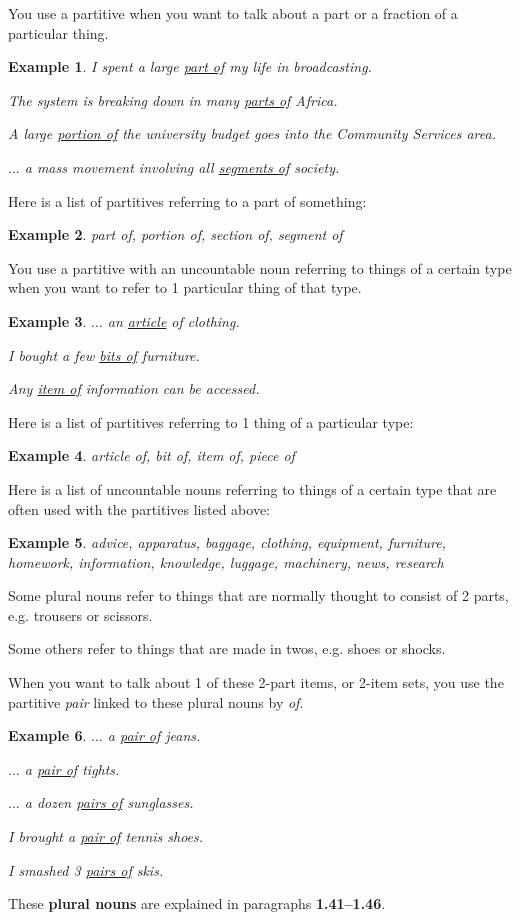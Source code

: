 \documentclass[oneside]{book}
\numberwithin{equation}{section}
\newtheorem{example}{Example}[section]
\begin{document}
%
\noindent{} You use a partitive when you want to talk about a part or a fraction of a particular thing.
\begin{example}
    I spent a large \underline{part of} my life in broadcasting.
    
    The system is breaking down in many \underline{parts of} Africa.
    
    A large \underline{portion of} the university budget goes into the Community Services area.
    
    $\ldots$ a mass movement involving all \underline{segments of} society.
\end{example}
Here is a list of partitives referring to a part of something:
\begin{example}
    part of, portion of, section of, segment of
\end{example}
%
\noindent{} You use a partitive with an uncountable noun referring to things of a certain type when you want to refer to 1 particular thing of that type.
\begin{example}
    $\ldots$ an \underline{article} of clothing.
    
    I bought a few \underline{bits of} furniture.
    
    Any \underline{item of} information can be accessed.
\end{example}
Here is a list of partitives referring to 1 thing of a particular type:
\begin{example}
    article of, bit of, item of, piece of
\end{example}
Here is a list of uncountable nouns referring to things of a certain type that are often used with the partitives listed above:
\begin{example}
    advice, apparatus, baggage, clothing, equipment, furniture, homework, information, knowledge, luggage, machinery, news, research
\end{example}
%
\noindent{} Some plural nouns refer to things that are normally thought to consist of 2 parts, e.g. trousers or scissors.

Some others refer to things that are made in twos, e.g. shoes or shocks.

When you want to talk about 1 of these 2-part items, or 2-item sets, you use the partitive \textit{pair} linked to these plural nouns by \textit{of}.
\begin{example}
    $\ldots$ a \underline{pair of} jeans.
    
    $\ldots$ a \underline{pair of} tights.
    
    $\ldots$ a dozen \underline{pairs of} sunglasses.
    
    I brought a \underline{pair of} tennis shoes.
    
    I smashed 3 \underline{pairs of} skis.
\end{example}
These \textbf{plural nouns} are explained in paragraphs \textbf{1.41--1.46}.
\end{document}
